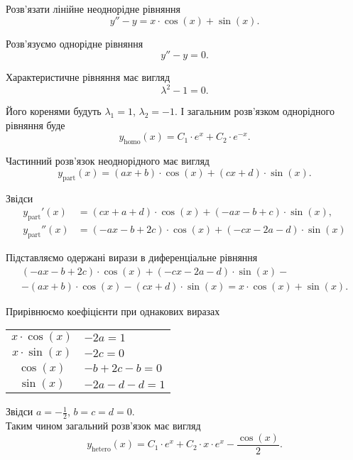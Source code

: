 \begin{example}
	Розв’язати лінійне неоднорідне рівняння \[ y'' - y = x \cdot \cos(x) + \sin (x).\]
\end{example}
\begin{solution}
	Розв’язуємо однорідне рівняння
	\begin{equation*}
		y'' - y = 0.
	\end{equation*}

	Характеристичне рівняння має вигляд
	\begin{equation*}
		\lambda^2 - 1 = 0.
	\end{equation*}

	Його коренями будуть $\lambda_1 = 1$, $\lambda_2 = -1$. І загальним роз\-в'яз\-ком однорідного рівняння буде
	\begin{equation*}
		y_{\text{homo}}(x) = C_1 \cdot e^x + C_2 \cdot e^{-x}.
	\end{equation*}

	Частинний розв’язок неоднорідного має вигляд
	\begin{equation*}
		y_{\text{part}}(x) = (a x + b) \cdot \cos (x) + (c x + d) \cdot \sin(x).
	\end{equation*}

	Звідси
	\begin{align*}
		y_{\text{part}}'(x) &= (c x + a + d) \cdot \cos (x) + (-a x - b + c) \cdot \sin(x), \\
		y_{\text{part}}''(x) &= (-a x - b + 2 c) \cdot \cos (x) + (- c x - 2 a - d) \cdot \sin(x)
	\end{align*}

	Підставляємо одержані вирази в диференціальне рівняння
	\begin{multline*}
		(-a x - b + 2 c) \cdot \cos (x) + (- c x - 2 a - d) \cdot \sin(x) - \\
		- (a x + b) \cdot \cos (x) - (c x + d) \cdot \sin(x) = x \cdot \cos(x) + \sin (x).
	\end{multline*}
		 
	Прирівнюємо коефіцієнти при однакових виразах
	\begin{table}[H]
		\centering
		\begin{tabular}{c|l}
			$x \cdot \cos (x)$ & $- 2 a = 1$ \\
			$x \cdot \sin (x)$ & $- 2 c = 0$ \\
			$\cos (x)$ & $- b + 2c - b = 0$ \\
			$\sin (x)$ & $- 2 a - d - d = 1$
		\end{tabular}
	\end{table}

	Звідси $a = - \frac12$, $b = c = d = 0$. \\

	Таким чином загальний розв’язок має вигляд
	\begin{equation*}
		y_{\text{hetero}}(x) = C_1 \cdot e^x + C_2 \cdot x \cdot e^{x} - \frac{\cos (x)}{2}.
	\end{equation*}
\end{solution}

